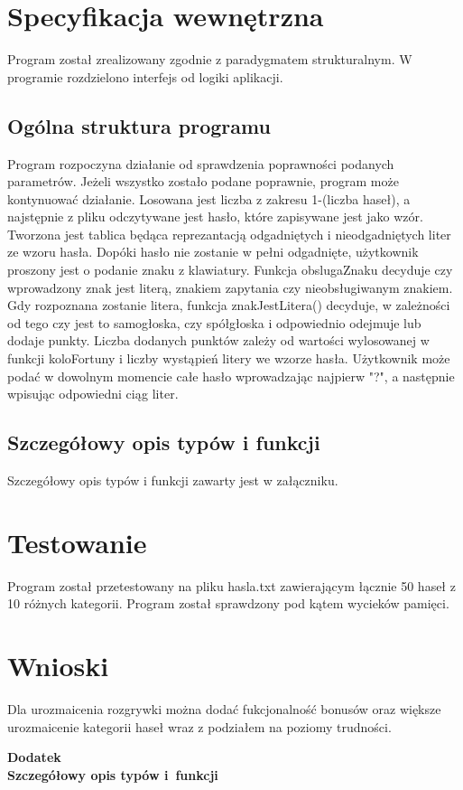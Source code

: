 \documentclass[12pt,a4paper,oneside]{article}
\begin{document}
\section{Specyfikacja wewnętrzna}\label{sec:sp-wew}
Program został zrealizowany zgodnie z paradygmatem strukturalnym.  
W programie rozdzielono interfejs od logiki aplikacji.


\subsection{Ogólna struktura programu}
Program rozpoczyna działanie od sprawdzenia poprawności podanych parametrów. Jeżeli wszystko zostało podane poprawnie, program może kontynuować działanie. Losowana jest liczba z zakresu 1-(liczba haseł), a najstępnie z pliku odczytywane jest hasło, które zapisywane jest jako wzór. Tworzona jest tablica będąca reprezantacją odgadniętych i nieodgadniętych liter ze wzoru hasła. Dopóki hasło nie zostanie w pełni odgadnięte, użytkownik proszony jest o podanie znaku z klawiatury. Funkcja obslugaZnaku decyduje czy wprowadzony znak jest literą, znakiem zapytania czy nieobsługiwanym znakiem. Gdy rozpoznana zostanie litera, funkcja znakJestLitera() decyduje, w zależności od tego czy jest to samogłoska, czy spółgłoska i odpowiednio odejmuje lub dodaje punkty. Liczba dodanych punktów zależy od wartości wylosowanej w funkcji koloFortuny i liczby wystąpień litery we wzorze hasła. Użytkownik może podać w dowolnym momencie całe hasło wprowadzając najpierw "?", a następnie wpisując odpowiedni ciąg liter.



\subsection{Szczegółowy opis typów i funkcji}

Szczegółowy opis typów i funkcji zawarty jest w załączniku.

 

\section{Testowanie}
	Program został przetestowany na pliku hasla.txt zawierającym łącznie 50 haseł z 10 różnych kategorii.
	Program został sprawdzony pod kątem wycieków pamięci.


\section{Wnioski}
Dla urozmaicenia rozgrywki można dodać fukcjonalność bonusów oraz większe urozmaicenie kategorii haseł wraz z podziałem na poziomy trudności.
 
\cleardoublepage

\rule{0cm}{0cm}

\vfill

\begin{center}
\Huge\bfseries Dodatek\\Szczegółowy opis typów i~funkcji\par
\end{center}

\vfill 

\rule{0cm}{0cm}
\end{document}
